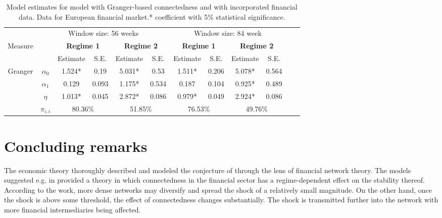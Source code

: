 \documentclass[12pt]{article}
\begin{document}
\begin{table}\small
	\begin{tabular}{cccccc | cccccc}
		& \multicolumn{5}{c}{Window size: 56 weeks} & \multicolumn{4}{c}{Window size: 84 week} \\
		Measure &  & \multicolumn{2}{c}{\bfseries Regime 1} & \multicolumn{2}{c}{\bfseries Regime 2} & \multicolumn{2}{c}{\bfseries Regime 1} & \multicolumn{2}{c}{\bfseries Regime 2} \\
		\hline
		& & Estimate & S.E. & Estimate & S.E. & Estimate & S.E. & Estimate & S.E. \\
		\hline
		\multirow{3}{*}[\normalbaselineskip]{Granger} & $\alpha_0$ & 1.524* & 0.19 & 5.031* & 0.53 & 1.511* & 0.206 & 5.078* & 0.564 \\
		& $\alpha_1$ & 0.129 & 0.093 & 1.175* & 0.534 & 0.187 & 0.104 & 0.925* & 0.489\\
		& $\eta$ & 1.013* & 0.045 & 2.872* & 0.086 & 0.979* & 0.049 & 2.924* & 0.086\\
		& $\pi_{i,i}$ &  \multicolumn{2}{c}{80.36\%} & \multicolumn{2}{c|}{51.85\%} & \multicolumn{2}{c}{76.53\%} & \multicolumn{2}{c}{49.76\%}\\
		\hline
	\end{tabular}
	\caption{Model estimates for model with Granger-based connectedness and with incorporated financial data. Data for European financial market.* coefficient with 5\% statistical significance.}
	\label{table:model_robust}
\end{table}

\section{Concluding remarks}\label{section:conclusion}

The economic theory thoroughly described and modeled the conjecture of \citet{haldane13} through the lens of financial network theory. The models suggested e.g. in \citet{acemoglu13} provided a theory in which connectedness in the financial sector has a regime-dependent effect on the stability thereof. According to the work, more dense networks may diversify and spread the shock of a relatively small magnitude. On the other hand, once the shock is above some threshold, the effect of connectedness changes substantially. The shock is transmitted further into the network with more financial intermediaries being affected.
\end{document}
